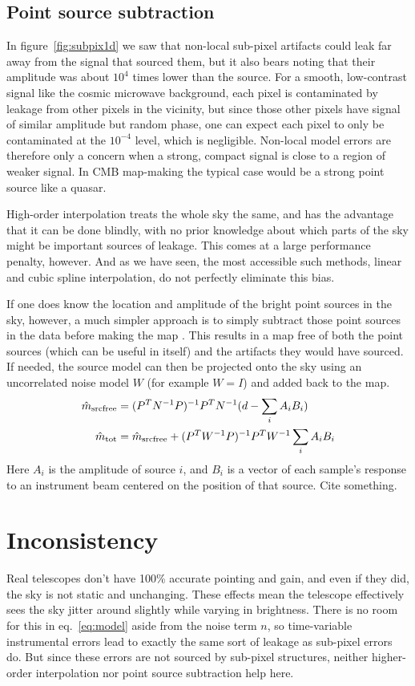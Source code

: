 \documentclass{article}
\begin{document}
\subsection{Point source subtraction}
In figure~\ref{fig:subpix1d} we saw that non-local sub-pixel artifacts could leak far away from the
signal that sourced them, but it also bears noting that their amplitude was about
$10^4$ times lower than the source. For a smooth, low-contrast signal like the
cosmic microwave background, each pixel is contaminated by leakage from
other pixels in the vicinity, but since those other pixels have signal of similar
amplitude but random phase, one can expect each pixel to only be contaminated at the
$10^{-4}$ level, which is negligible. Non-local model errors are therefore only
a concern when a strong, compact signal is close to a region of weaker signal. In
CMB map-making the typical case would be a strong point source like a quasar.

High-order interpolation treats the whole sky the same, and has the advantage that it
can be done blindly, with no prior knowledge about which parts of the sky might
be important sources of leakage. This comes at a large performance
penalty, however. And as we have seen, the most accessible such methods, linear and cubic spline
interpolation, do not perfectly eliminate this bias.

If one does know the location
and amplitude of the bright point sources in the sky, however, a much simpler approach
is to simply subtract those point sources in the data before making the map
\citep{dunner/etal/2013}. This
results in a map free of both the point sources (which can be useful in itself)
and the artifacts they would have sourced. If needed, the source model can then be
projected onto the sky using an uncorrelated noise model $W$ (for example $W=I$)
and added back to the map.
\begin{align}
\hat m_\textrm{srcfree} &= (P^TN^{-1}P)^{-1}P^TN^{-1}(d - \sum_i A_i B_i) \notag \\
\hat m_\textrm{tot} &= \hat m_\textrm{srcfree} + (P^TW^{-1}P)^{-1}P^T W^{-1}\sum_i A_i B_i
\end{align}
Here $A_i$ is the amplitude of source $i$, and $B_i$ is a vector of each sample's
response to an instrument beam centered on the position of that source. Cite
something.

\section{Inconsistency}
\label{sect:inconsistency}
Real telescopes don't have 100\% accurate pointing and gain, and even if they did, the
sky is not static and unchanging. These effects mean the telescope effectively sees the
sky jitter around slightly while varying in brightness. There is no room for this in
eq.~\ref{eq:model} aside from the noise term $n$, so time-variable instrumental errors
lead to exactly the same sort of leakage as
sub-pixel errors do. But since these errors are not sourced by sub-pixel structures,
neither higher-order interpolation nor point source subtraction help here.
\end{document}
